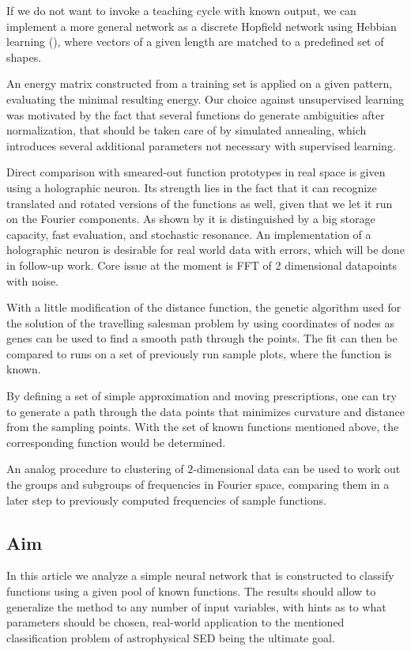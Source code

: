 \documentclass[useAMS,usenatbib]{mn2e}
\begin{document}
If we do not want to invoke a teaching cycle with known output, we can
implement a more general network as a discrete Hopfield network using
Hebbian learning (\cite{Hopfield1982}), where vectors of a given
length are matched to a predefined set of shapes.

An energy matrix constructed from a training set is applied on a given
pattern, evaluating the minimal resulting energy. Our choice against
unsupervised learning was motivated by the fact that several functions
do generate ambiguities after normalization, that should be taken care
of by simulated annealing, which introduces several additional
parameters not necessary with supervised learning.

Direct comparison with smeared-out function prototypes in real space
is given using a holographic neuron. Its strength lies in the fact
that it can recognize translated and rotated versions of the functions
as well, given that we let it run on the Fourier components. As shown
by \cite{Stoop2003} it is distinguished by a big storage capacity, fast
evaluation, and stochastic resonance. An implementation of a
holographic neuron is desirable for real world data with errors, which
will be done in follow-up work. Core issue at the moment is FFT of 2
dimensional datapoints with noise.

With a little modification of the distance function, the genetic
algorithm used for the solution of the travelling salesman problem by
using coordinates of nodes as genes can be used to find a smooth path
through the points. The fit can then be compared to runs on a set of
previously run sample plots, where the function is known.

By defining a set of simple approximation and moving prescriptions,
one can try to generate a path through the data points that minimizes
curvature and distance from the sampling points. With the set of known
functions mentioned above, the corresponding function would be
determined.

An analog procedure to clustering of $2$-dimensional data can be used
to work out the groups and subgroups of frequencies in Fourier space,
comparing them in a later step to previously computed frequencies of
sample functions.

\subsection{Aim}
In this article we analyze a simple neural network that is constructed
to classify functions using a given pool of known functions. The
results should allow to generalize the method to any number of input
variables, with hints as to what parameters should be chosen,
real-world application to the mentioned classification problem of
astrophysical SED being the ultimate goal.
\end{document}
